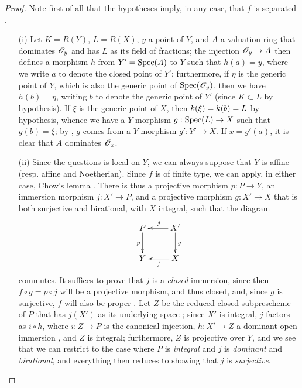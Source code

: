 \begin{proof}
Note first of all that the hypotheses imply, in any case, that $f$ is separated .
\begin{enumerate}
    \item[\rm{(i)}] Let $K=R(Y)$, $L=R(X)$, $y$ a point of $Y$, and $A$ a valuation ring that dominates $\mathscr{O}_y$ and has $L$ as its field of fractions;
        the injection $\sh{O}_y\to A$ then defines a morphism $h$ from $Y'=\operatorname{Spec}(A)$ to $Y$  such that $h(a)=y$, where we write $a$ to denote the closed point of $Y'$;
        furthermore, if $\eta$ is the generic point of $Y$, which is also the generic point of $\operatorname{Spec}(\mathscr{O}_y)$, then we have $h(b)=\eta$, writing $b$ to denote the generic point of $Y'$ (since $K\subset L$ by hypothesis).
        If $\xi$ is the generic point of $X$, then $k(\xi)=k(b)=L$ by hypothesis, whence we have a $Y$-morphism $g:\Spec(L)\to X$ such that $g(b)=\xi$;
        by , $g$ comes from a $Y$-morphism $g':Y'\to X$.
        If $x=g'(a)$, it is clear that $A$ dominates $\mathscr{O}_x$.
    \item[\rm{(ii)}] Since the questions is local on $Y$, we can always suppose that $Y$ is affine (resp. affine and Noetherian).
        Since $f$ is of finite type, we can apply, in either case, Chow's lemma .
        There is thus a projective morphism $p:P\to Y$, an immersion morphism $j:X'\to P$, and a projective morphism $g:X'\to X$ that is both surjective and birational, with $X$ integral, such that the diagram
        \[
            \xymatrix{
                P \ar[d]_p
                & X' \ar[l]_j \ar[d]^g
            \\  Y
                & X \ar[l]^f
            }
        \]
        commutes.
        It suffices to prove that $j$ is a \emph{closed} immersion, since then $f\circ g=p\circ j$ will be a projective morphism, and thus closed, and, since $g$ is surjective, $f$ will also be proper .
        Let $Z$ be the reduced closed subprescheme of $P$ that has $\overline{j(X')}$ as its underlying space ;
        since $X'$ is integral, $j$ factors as $i\circ h$, where $i:Z\to P$ is the canonical injection, $h:X'\to Z$ a dominant open immersion , and $Z$ is integral;
        furthermore, $Z$ is projective over $Y$, and we see that we can restrict to the case where $P$ is \emph{integral} and $j$ is \emph{dominant} and \emph{birational}, and everything then reduces to showing that $j$ is \emph{surjective}.

\end{enumerate}
\end{proof}
